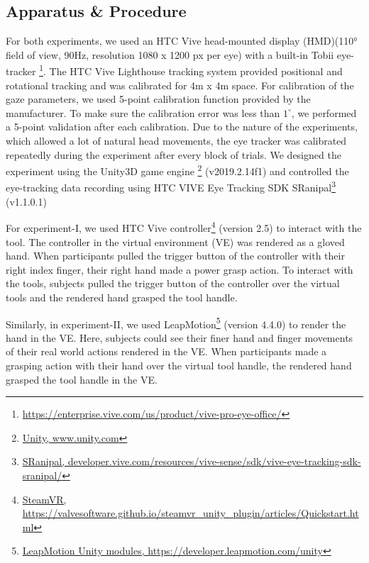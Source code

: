 
\subsection{Apparatus \& Procedure}
For both experiments, we used an HTC Vive head-mounted display (HMD)(110° field of view, 90Hz, resolution 1080 x 1200 px per eye) with a built-in Tobii  eye-tracker \footnote{\href{https://enterprise.vive.com/us/product/vive-pro-eye/}{https://enterprise.vive.com/us/product/vive-pro-eye-office/}}. The HTC Vive Lighthouse tracking system provided positional and rotational tracking and was calibrated for 4m x 4m space. For calibration of the gaze parameters, we used 5-point calibration function provided by the manufacturer. To make sure the calibration error was less than $1^\circ$, we performed a 5-point validation after each calibration. Due to the nature of the experiments, which allowed a lot of natural head movements, the eye tracker was calibrated repeatedly during the experiment after every block of trials. We designed the experiment using the Unity3D game engine \footnote{\href{www.unity.com}{Unity, www.unity.com}} (v2019.2.14f1) and controlled the eye-tracking data recording using HTC VIVE Eye Tracking SDK SRanipal\footnote{\href{https://developer.vive.com/resources/vive-sense/sdk/vive-eye-tracking-sdk-sranipal/}{SRanipal, developer.vive.com/resources/vive-sense/sdk/vive-eye-tracking-sdk-sranipal/}} (v1.1.0.1)

For experiment-I, we used HTC Vive controller\footnote{\href{https://valvesoftware.github.io/steamvr_unity_plugin/articles/Quickstart.html}{SteamVR, https://valvesoftware.github.io/steamvr\_unity\_plugin/articles/Quickstart.html}} (version 2.5) to interact with the tool. The controller in the virtual environment (VE) was rendered as a gloved hand. When participants pulled the trigger button of the controller with their right index finger, their right hand made a power grasp action. To interact with the tools, subjects pulled the trigger button of the controller over the virtual tools and the rendered hand grasped the tool handle. 

Similarly, in experiment-II, we used LeapMotion\footnote{\href{https://developer.leapmotion.com/unity}{LeapMotion Unity modules, https://developer.leapmotion.com/unity}} (version 4.4.0) to render the hand in the VE. Here, subjects could see their finer hand and finger movements of their real world actions rendered in the VE. When participants made a grasping action with their hand over the virtual tool handle, the rendered hand grasped the tool handle in the VE.

